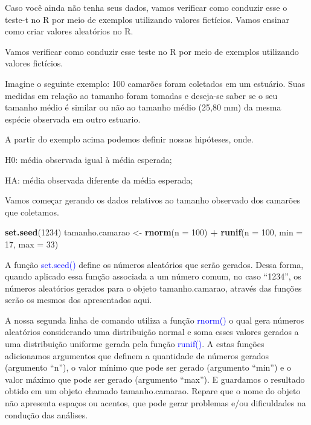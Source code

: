\documentclass[14pt,titlepage, oneside, openany, a4paper]{book}
\newenvironment{Shaded}{\begin{snugshade}}{\end{snugshade}}
\newcommand{\DataTypeTok}[1]{\textcolor[rgb]{0.13,0.29,0.53}{#1}}
\newcommand{\DecValTok}[1]{\textcolor[rgb]{0.00,0.00,0.81}{#1}}
\newcommand{\KeywordTok}[1]{\textcolor[rgb]{0.13,0.29,0.53}{\textbf{#1}}}
\newcommand{\NormalTok}[1]{#1}
\newcommand{\OperatorTok}[1]{\textcolor[rgb]{0.81,0.36,0.00}{\textbf{#1}}}
\newcommand{\StringTok}[1]{\textcolor[rgb]{0.31,0.60,0.02}{#1}}
\begin{document}
Caso você ainda não tenha seus dados, vamos verificar como conduzir esse o teste-t no R por meio de exemplos utilizando valores fictícios. Vamos ensinar como criar valores aleatórios no R.

Vamos verificar como conduzir esse teste no R por meio de exemplos utilizando valores fictícios.

Imagine o seguinte exemplo: 100 camarões foram coletados em um estuário. Suas medidas em relação ao tamanho foram tomadas e deseja-se saber se o seu tamanho médio é similar ou não ao tamanho médio (25,80 mm) da mesma espécie observada em outro estuario.

A partir do exemplo acima podemos definir nossas hipóteses, onde.

H0: média observada igual à média esperada;

HA: média observada diferente da média esperada;

Vamos começar gerando os dados relativos ao tamanho observado dos camarões que coletamos.

\begin{Shaded}
\begin{Highlighting}[]
\KeywordTok{set.seed}\NormalTok{(}\DecValTok{1234}\NormalTok{)}
\NormalTok{tamanho.camarao <-}\StringTok{ }\KeywordTok{rnorm}\NormalTok{(}\DataTypeTok{n =} \DecValTok{100}\NormalTok{) }\OperatorTok{+}\StringTok{ }\KeywordTok{runif}\NormalTok{(}\DataTypeTok{n =} \DecValTok{100}\NormalTok{, }\DataTypeTok{min =} \DecValTok{17}\NormalTok{, }\DataTypeTok{max =} \DecValTok{33}\NormalTok{)}
\end{Highlighting}
\end{Shaded}

A função \textcolor{blue}{set.seed()} define os números aleatórios que serão gerados. Dessa forma, quando aplicado essa função associada a um número comum, no caso ``1234'', os números aleatórios gerados para o objeto tamanho.camarao, através das funções serão os mesmos dos apresentados aqui.

A nossa segunda linha de comando utiliza a função \textcolor{blue}{rnorm()} o qual gera números aleatórios considerando uma distribuição normal e soma esses valores gerados a uma distribuição uniforme gerada pela função \textcolor{blue}{runif()}. A estas funções adicionamos argumentos que definem a quantidade de números gerados (argumento ``n''), o valor mínimo que pode ser gerado (argumento ``min'') e o valor máximo que pode ser gerado (argumento ``max''). E guardamos o resultado obtido em um objeto chamado tamanho.camarao. Repare que o nome do objeto não apresenta espaços ou acentos, que pode gerar problemas e/ou dificuldades na condução das análises.
\end{document}
